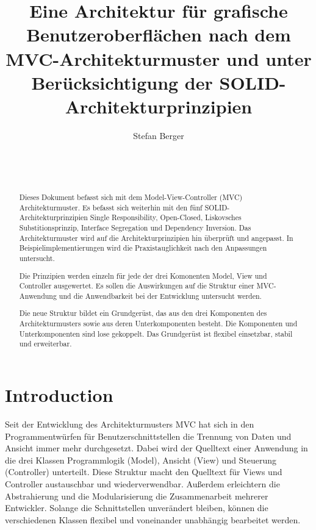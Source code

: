 \documentclass{vldb}
\begin{document}

\title{Eine Architektur für grafische Benutzeroberflächen nach
dem MVC-Architekturmuster und unter Berücksichtigung
der SOLID-Architekturprinzipien}

\author{
\alignauthor
Stefan Berger\\
       \\
       \\
       \\
}

\maketitle

\begin{abstract}
  Dieses Dokument befasst sich mit dem Model-View-Con\-trol\-ler (MVC) Architekturmuster. Es befasst sich weiterhin mit den fünf SOLID-Architekturprinzipien Single Responsibi\-lity, Open-Closed, Liskovsches Substitionsprinzip, Interface Segregation und Dependency Inversion. Das Architekturmuster wird auf die Architekturprinzipien hin überprüft und angepasst. In Beispiel\-implementierungen wird die Praxistauglichkeit nach den Anpassungen untersucht.

  Die Prinzipien werden einzeln für jede der drei Komonenten Model, View und Controller ausgewertet. Es sollen die Auswirkungen auf die Struktur einer MVC-Anwendung und die Anwendbarkeit bei der Entwicklung untersucht werden.

  Die neue Struktur bildet ein Grundgerüst, das aus den drei Komponenten des Architekturmusters sowie aus deren Unterkomponenten besteht. Die Komponenten und Unterkomponenten sind lose gekoppelt. Das Grundgerüst ist flexibel einsetzbar, stabil und erweiterbar.
\end{abstract}

\section{Introduction}
Seit der Entwicklung des Architekturmusters MVC hat sich in den Programmentwürfen für Benutzerschnittstellen die Trennung von Daten und Ansicht immer mehr durchgesetzt. Dabei wird der Quelltext einer Anwendung in die drei Klassen Programmlogik (Model), Ansicht (View) und Steuerung (Controller) unterteilt. Diese Struktur macht den Quelltext für Views und Controller austauschbar und wiederverwendbar. Außerdem erleichtern die Abstrahierung und die Modularisierung die Zusammenarbeit mehrerer Entwickler. Solange die Schnittstellen unverändert bleiben, können die verschiedenen Klassen flexibel und voneinander unabhängig bearbeitet werden.
\end{document}
